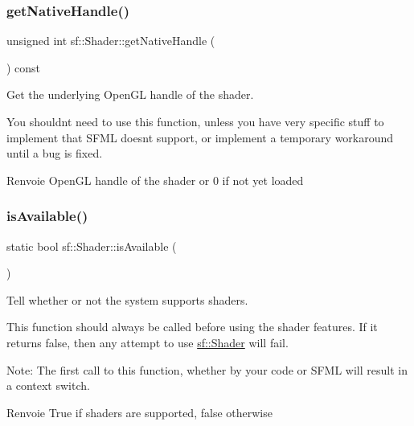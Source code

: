 \subsubsection{\texorpdfstring{get\+Native\+Handle()}{getNativeHandle()}}
{\footnotesize\ttfamily unsigned int sf\+::\+Shader\+::get\+Native\+Handle (\begin{DoxyParamCaption}{ }\end{DoxyParamCaption}) const}



Get the underlying Open\+GL handle of the shader. 

You shouldn\textquotesingle{}t need to use this function, unless you have very specific stuff to implement that S\+F\+ML doesn\textquotesingle{}t support, or implement a temporary workaround until a bug is fixed.

\begin{DoxyReturn}{Renvoie}
Open\+GL handle of the shader or 0 if not yet loaded 
\end{DoxyReturn}
\mbox{\label{classsf_1_1Shader_ad22474690bafe4a305c1b9826b1bd86a}} 
\subsubsection{\texorpdfstring{is\+Available()}{isAvailable()}}
{\footnotesize\ttfamily static bool sf\+::\+Shader\+::is\+Available (\begin{DoxyParamCaption}{ }\end{DoxyParamCaption})\hspace{0.3cm}{\ttfamily [static]}}



Tell whether or not the system supports shaders. 

This function should always be called before using the shader features. If it returns false, then any attempt to use \hyperlink{classsf_1_1Shader}{sf\+::\+Shader} will fail.

Note\+: The first call to this function, whether by your code or S\+F\+ML will result in a context switch.

\begin{DoxyReturn}{Renvoie}
True if shaders are supported, false otherwise 
\end{DoxyReturn}
\mbox{\label{classsf_1_1Shader_a053a5632848ebaca2fcd8ba29abe9e6e}} 
